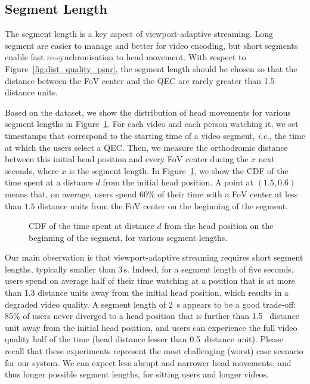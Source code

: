 \subsection{Segment Length}

The segment length is a key
aspect of viewport-adaptive streaming. Long segment are easier to manage and better for video encoding, 
but short segments enable fast re-synchronisation to head movement. With respect to 
Figure~\ref{fig:dist_quality_psnr}, the 
segment length should be chosen so that the 
distance between the FoV center and the QEC are rarely greater than 1.5 distance units.

Based on the dataset, we show the distribution of head movements for various segment lengths
in Figure~\ref{cdf-dataset}. For each video and each person watching
it, we set timestamps that correspond to the starting time of a video
segment, \textit{i.e.,} the time at which the users select a QEC. Then, we measure the orthodromic distance
between this initial head position and every FoV center during the $x$
next seconds, where $x$ is the segment length. In
Figure~\ref{cdf-dataset}, we show the \ac{CDF} of the time spent at a
distance $d$ from the initial head position. A point at $(1.5,0.6)$
means that, on average, users spend $60\%$ of their time with a FoV
center at less than $1.5$ distance units from the FoV center on the
beginning of the segment.

\begin{figure}[htbp]
\centering

\caption{CDF of the time spent at distance $d$ from the head position on the beginning of the
segment, for various segment lengths.}\label{cdf-dataset}
\end{figure}

Our main observation is that viewport-adaptive streaming requires
short segment lengths, typically smaller than 3\,s. Indeed, for a
segment length of five seconds, users spend on average half of their
time watching at a position that is at more than 1.3 distance units
away from the initial head position, which results in a degraded video
quality. A segment length of \SI{2}{\second} appears to be a good trade-off: 
85\% of
users never diverged to a head position that is further than 1.5~
distance unit away from the initial head position, and users can experience the full
video quality half of the time (head distance lesser than 0.5~distance unit). Please recall that
these experiments represent the most challenging (worst) case scenario
for our system. We can expect less abrupt and narrower head movements,
and thus longer possible segment lengths, for sitting users and longer
videos.

